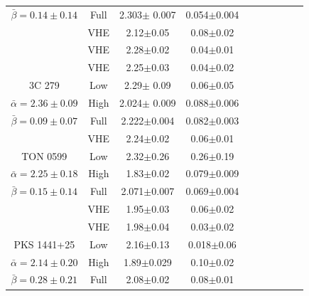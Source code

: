 \documentclass[11pt]{article}
\begin{document}
\begin{table}[htbp]
{\begin{tabular}{|c|c|c|c|c|c|c|c|c|c|}
        $\bar{\beta}=0.14\pm0.14$ & Full & 2.303$\pm$ 0.007 & 0.054$\pm$0.004 \\ %
         & VHE & 2.12$\pm$0.05 & 0.08$\pm$0.02 \\
         & VHE & 2.28$\pm$0.02 & 0.04$\pm$0.01 \\
         & VHE & 2.25$\pm$0.03 & 0.04$\pm$0.02 \\
    \hline
       3C 279 & Low & 2.29$\pm$ 0.09 & 0.06$\pm$0.05 \\ %
        $\bar{\alpha}=2.36\pm0.09$ & High & 2.024$\pm$ 0.009 & 0.088$\pm$0.006 \\ %
        $\bar{\beta}=0.09\pm0.07$ & Full & 2.222$\pm$0.004 & 0.082$\pm$0.003 \\ %
         & VHE & 2.24$\pm$0.02 & 0.06$\pm$0.01 \\
    \hline
       TON 0599 & Low & 2.32$\pm$0.26 & 0.26$\pm$0.19 \\ %
        $\bar{\alpha}=2.25\pm0.18$ & High & 1.83$\pm$0.02 & 0.079$\pm$0.009 \\ %
        $\bar{\beta}=0.15\pm0.14$ & Full & 2.071$\pm$0.007 & 0.069$\pm$0.004 \\ %
         & VHE & 1.95$\pm$0.03 & 0.06$\pm$0.02 \\
         & VHE & 1.98$\pm$0.04 & 0.03$\pm$0.02 \\
    \hline
       PKS 1441+25 & Low & 2.16$\pm$0.13 & 0.018$\pm$0.06 \\ %
        $\bar{\alpha}=2.14\pm0.20$ & High & 1.89$\pm$0.029 & 0.10$\pm$0.02 \\ %
        $\bar{\beta}=0.28\pm0.21$ & Full & 2.08$\pm$0.02 & 0.08$\pm$0.01 \\ %

\end{tabular}}
\end{table}
\end{document}
